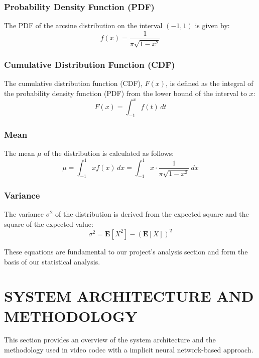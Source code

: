\documentclass{ioereport}
\begin{document}
\subsubsection{Probability Density Function (PDF)}
The PDF of the arcsine distribution on the interval \((-1, 1)\) is given by:
\begin{equation}
f(x) = \frac{1}{\pi \sqrt{1-x^2}}
\end{equation}

\subsubsection{Cumulative Distribution Function (CDF)}
The cumulative distribution function (CDF), \( F(x) \), is defined as the integral of the probability density function (PDF) from the lower bound of the interval to \( x \):
\begin{equation}
F(x) = \int_{-1}^{x} f(t) \, dt
\end{equation}

\subsubsection{Mean}
The mean \(\mu\) of the distribution is calculated as follows:
\begin{equation}
\mu = \int_{-1}^{1} x f(x) \, dx = \int_{-1}^{1} x \cdot \frac{1}{\pi \sqrt{1-x^2}} \, dx
\end{equation}

\subsubsection{Variance}
The variance \(\sigma^2\) of the distribution is derived from the expected square and the square of the expected value:
\begin{equation}
\sigma^2 = \mathbf{E}[X^2] - (\mathbf{E}[X])^2
\end{equation}

These equations are fundamental to our project's analysis section and form the basis of our statistical analysis.


\section{\MakeUppercase{System Architecture and Methodology}}   
This section provides an overview of the system architecture and the methodology used in video \gls{codec} with a implicit neural network-based approach.
\end{document}
